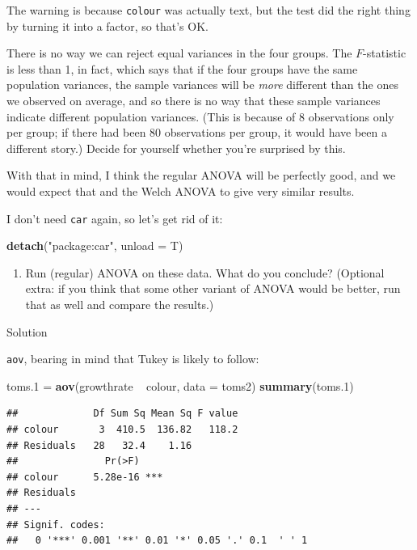 \documentclass[]{tufte-book}
\newenvironment{Shaded}{}{}
\newcommand{\DataTypeTok}[1]{\textcolor[rgb]{0.56,0.13,0.00}{#1}}
\newcommand{\FloatTok}[1]{\textcolor[rgb]{0.25,0.63,0.44}{#1}}
\newcommand{\KeywordTok}[1]{\textcolor[rgb]{0.00,0.44,0.13}{\textbf{#1}}}
\newcommand{\NormalTok}[1]{#1}
\newcommand{\OperatorTok}[1]{\textcolor[rgb]{0.40,0.40,0.40}{#1}}
\newcommand{\StringTok}[1]{\textcolor[rgb]{0.25,0.44,0.63}{#1}}
\providecommand{\tightlist}{%
  \setlength{\itemsep}{0pt}\setlength{\parskip}{0pt}}
\theoremstyle{definition}
\theoremstyle{definition}
\theoremstyle{definition}
\theoremstyle{remark}
\begin{document}
The warning is because \texttt{colour} was actually text, but the test
did the right thing by turning it into a factor, so that's OK.

There is no way we can reject equal variances in the four groups. The
\(F\)-statistic is less than 1, in fact, which says that if the four
groups have the same population variances, the sample variances will be
\emph{more} different than the ones we observed on average, and so there
is no way that these sample variances indicate different population
variances. (This is because of 8 observations only per group; if there
had been 80 observations per group, it would have been a different
story.) Decide for yourself whether you're surprised by this.

With that in mind, I think the regular ANOVA will be perfectly good, and
we would expect that and the Welch ANOVA to give very similar results.

I don't need \texttt{car} again, so let's get rid of it:

\begin{Shaded}
\begin{Highlighting}[]
\KeywordTok{detach}\NormalTok{(}\StringTok{"package:car"}\NormalTok{, }\DataTypeTok{unload =}\NormalTok{ T)}
\end{Highlighting}
\end{Shaded}

\begin{enumerate}
\def\labelenumi{(\alph{enumi})}
\setcounter{enumi}{4}
\tightlist
\item
  Run (regular) ANOVA on these data. What do you conclude? (Optional
  extra: if you think that some other variant of ANOVA would be better,
  run that as well and compare the results.)
\end{enumerate}

Solution

\texttt{aov}, bearing in mind that Tukey is likely to follow:

\begin{Shaded}
\begin{Highlighting}[]
\NormalTok{toms}\FloatTok{.1}\NormalTok{ =}\StringTok{ }\KeywordTok{aov}\NormalTok{(growthrate }\OperatorTok{~}\StringTok{ }\NormalTok{colour, }\DataTypeTok{data =}\NormalTok{ toms2)}
\KeywordTok{summary}\NormalTok{(toms}\FloatTok{.1}\NormalTok{)}
\end{Highlighting}
\end{Shaded}

\begin{verbatim}
##             Df Sum Sq Mean Sq F value
## colour       3  410.5  136.82   118.2
## Residuals   28   32.4    1.16        
##               Pr(>F)    
## colour      5.28e-16 ***
## Residuals               
## ---
## Signif. codes:  
##   0 '***' 0.001 '**' 0.01 '*' 0.05 '.' 0.1  ' ' 1
\end{verbatim}
\end{document}
